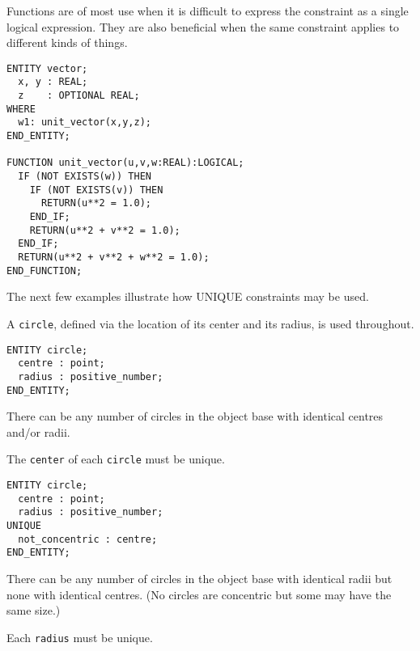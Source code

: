 \clearpage

    Functions are of most use when it is difficult to express the constraint
as a single logical expression. They are also beneficial when the same
constraint applies to different kinds of things.

\begin{verbatim}
ENTITY vector;
  x, y : REAL;
  z    : OPTIONAL REAL;
WHERE
  w1: unit_vector(x,y,z);
END_ENTITY;

FUNCTION unit_vector(u,v,w:REAL):LOGICAL;
  IF (NOT EXISTS(w)) THEN
    IF (NOT EXISTS(v)) THEN
      RETURN(u**2 = 1.0);
    END_IF;
    RETURN(u**2 + v**2 = 1.0);
  END_IF;
  RETURN(u**2 + v**2 + w**2 = 1.0);
END_FUNCTION;
\end{verbatim}


\begin{remarks}
\remintro
{}

    The next few examples illustrate how UNIQUE constraints
may be used.

   A \texttt{circle}, defined via the location of its center 
and its radius, is used throughout.

\remend
\end{remarks}


\begin{verbatim}
ENTITY circle;
  centre : point;
  radius : positive_number;
END_ENTITY;
\end{verbatim}

There can be any number of circles in the object base with identical centres
and/or radii.

\begin{remarks}
\remintro
{}

    The \texttt{center} of each \texttt{circle} must be unique.

\remend
\end{remarks}

\clearpage

\begin{verbatim}
ENTITY circle;
  centre : point;
  radius : positive_number;
UNIQUE
  not_concentric : centre;
END_ENTITY;
\end{verbatim}

There can be any number of circles in the object base with identical 
radii but none with identical centres.
(No circles are concentric but some may have the same size.)

\begin{remarks}
\remintro
{}

    Each \texttt{radius} must be unique.

\remend
\end{remarks}

